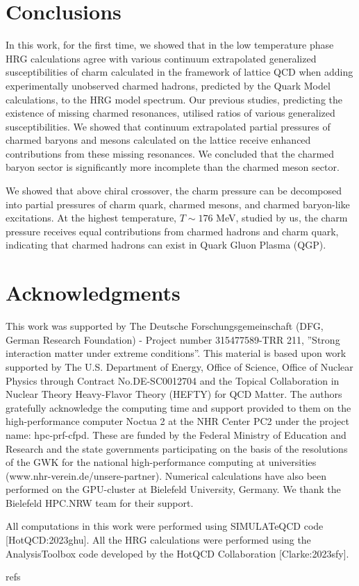 \documentclass[11pt,a4paper]{article}
\begin{document}
\section{Conclusions}

In this work, for the first time, we showed that in the low temperature phase HRG calculations agree with various continuum extrapolated generalized susceptibilities of charm calculated in the framework of lattice QCD when adding experimentally unobserved charmed hadrons, predicted by the Quark Model calculations, to the HRG model spectrum. Our previous studies, predicting the existence of missing charmed resonances, utilised ratios of various generalized susceptibilities. We showed that continuum extrapolated partial pressures of charmed baryons and mesons calculated on the lattice receive enhanced contributions from these missing resonances. We concluded that the charmed baryon sector is significantly more incomplete than the charmed meson sector.

We showed that above chiral crossover, the charm pressure can be decomposed into partial pressures of charm quark, charmed mesons, and charmed baryon-like excitations. At the highest temperature,  $T \sim 176$  MeV, studied by us, the charm pressure receives equal contributions from charmed hadrons and charm quark, indicating that charmed hadrons can exist in Quark Gluon Plasma (QGP).

\section{Acknowledgments}

This work was supported by The Deutsche Forschungsgemeinschaft (DFG, German Research Foundation) - Project number 315477589-TRR 211, ”Strong interaction matter under extreme conditions”. This material is based upon work supported by The U.S. Department of Energy, Office of Science, Office of Nuclear Physics through Contract No.DE-SC0012704 and the Topical Collaboration in Nuclear Theory Heavy-Flavor Theory (HEFTY) for QCD Matter. The authors gratefully acknowledge the computing time and support provided to them on the high-performance computer Noctua 2 at the NHR Center PC2 under the project name: hpc-prf-cfpd. These are funded by the Federal Ministry of Education and Research and the state governments participating on the basis of the resolutions of the GWK for the national high-performance computing at universities (www.nhr-verein.de/unsere-partner). Numerical calculations have also been performed on the GPU-cluster at Bielefeld University, Germany. We thank the Bielefeld HPC.NRW team for their support.

All computations in this work were performed using SIMULATeQCD code [HotQCD:2023ghu]. All the HRG calculations were performed using the AnalysisToolbox code developed by the HotQCD Collaboration [Clarke:2023sfy].

refs
\end{document}

